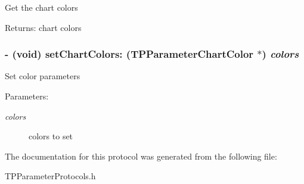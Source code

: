Get the chart colors \begin{Desc}
\item[Returns:]chart colors \end{Desc}
\hypertarget{protocol_t_p_chart_color-p_cce9d732cc3fd7f56a1e14fb73e8a1cb}{
\subsubsection[{setChartColors:}]{\setlength{\rightskip}{0pt plus 5cm}- (void) setChartColors: ({\bf TPParameterChartColor} $\ast$) {\em colors}}}
\label{protocol_t_p_chart_color-p_cce9d732cc3fd7f56a1e14fb73e8a1cb}


Set color parameters \begin{Desc}
\item[Parameters:]
\begin{description}
\item[{\em colors}]colors to set \end{description}
\end{Desc}


The documentation for this protocol was generated from the following file:\begin{CompactItemize}
\item 
TPParameterProtocols.h\end{CompactItemize}
